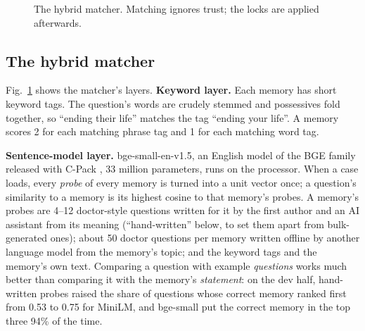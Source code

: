 \documentclass[sn-mathphys-num]{sn-jnl}
\begin{document}
\begin{figure}[t]
\centering
{}
\caption{The hybrid matcher. Matching ignores trust; the locks are applied afterwards.}
\label{fig:method}
\end{figure}

\subsection{The hybrid matcher}
Fig.~\ref{fig:method} shows the matcher's layers.
\textbf{Keyword layer.} Each memory has short keyword tags. The question's words are crudely stemmed and possessives fold together, so
``ending their life'' matches the tag ``ending your life''. A memory scores 2 for each matching phrase tag and 1 for each matching word tag.

\textbf{Sentence-model layer.} bge-small-en-v1.5, an English model of the BGE family released with C-Pack \cite{xiao2023cpack}, 33 million parameters, runs on the processor. When a case loads, every
\emph{probe} of every memory is turned into a unit vector once; a question's similarity to a memory is its highest cosine to that memory's probes.
A memory's probes are 4--12 doctor-style questions written for it by the first author and an AI assistant from its meaning
(``hand-written'' below, to set them apart from bulk-generated ones); about 50 doctor questions per memory written offline
by another language model from the memory's topic; and the keyword tags and the memory's own text. Comparing a question with example
\emph{questions} works much better than comparing it with the memory's \emph{statement}: on the dev half, hand-written probes raised the share of
questions whose correct memory ranked first from 0.53 to 0.75 for MiniLM, and bge-small put the correct memory in the top three 94\% of the time.
\end{document}
